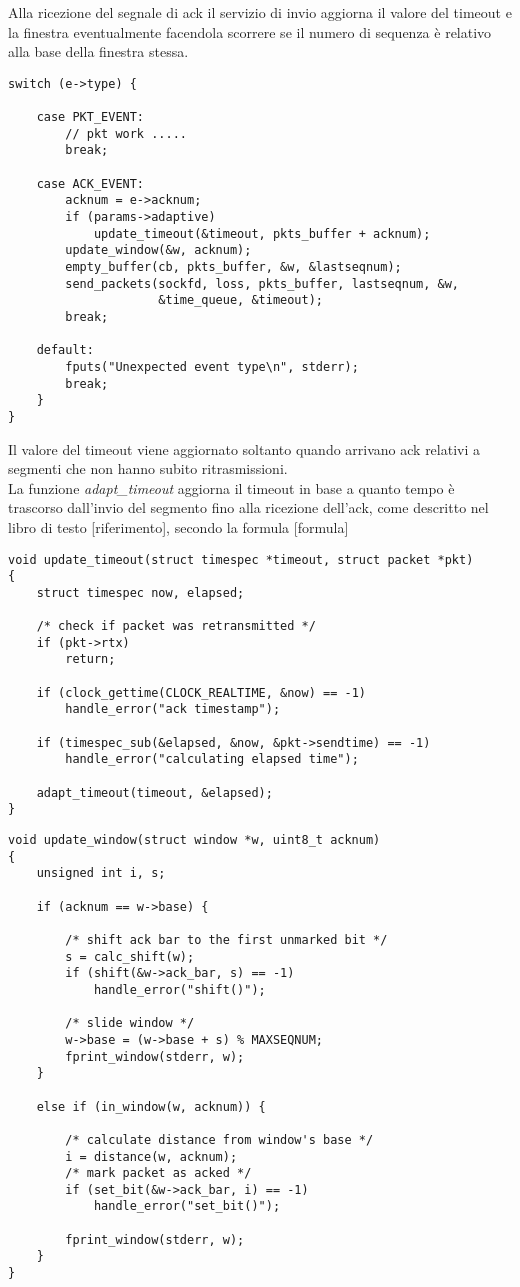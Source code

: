 Alla ricezione del segnale di ack il servizio di invio aggiorna il valore 
del timeout e la finestra eventualmente facendola scorrere se il numero
di sequenza è relativo alla base della finestra stessa.

\begin{lstlisting}[title=transport.c]
switch (e->type) {

    case PKT_EVENT:
        // pkt work .....
        break;

    case ACK_EVENT:
        acknum = e->acknum;
        if (params->adaptive)
            update_timeout(&timeout, pkts_buffer + acknum);
        update_window(&w, acknum);
        empty_buffer(cb, pkts_buffer, &w, &lastseqnum);
        send_packets(sockfd, loss, pkts_buffer, lastseqnum, &w,
                     &time_queue, &timeout);
        break;

    default:
        fputs("Unexpected event type\n", stderr);
        break;
    }
}
\end{lstlisting}
Il valore del timeout viene aggiornato soltanto quando arrivano ack relativi
a segmenti che non hanno subito ritrasmissioni.\\
La funzione \emph{adapt\_timeout} aggiorna il timeout in base a quanto tempo
è trascorso dall'invio del segmento fino alla ricezione dell'ack, come
descritto nel libro di testo [riferimento], secondo la formula [formula]
\begin{lstlisting}[title=transport.c]
void update_timeout(struct timespec *timeout, struct packet *pkt)
{
    struct timespec now, elapsed;

    /* check if packet was retransmitted */
    if (pkt->rtx)
        return;

    if (clock_gettime(CLOCK_REALTIME, &now) == -1)
        handle_error("ack timestamp");

    if (timespec_sub(&elapsed, &now, &pkt->sendtime) == -1)
        handle_error("calculating elapsed time");

    adapt_timeout(timeout, &elapsed);
}
\end{lstlisting}
\begin{lstlisting}[title=window.c]
void update_window(struct window *w, uint8_t acknum)
{
    unsigned int i, s;

    if (acknum == w->base) {

        /* shift ack bar to the first unmarked bit */
        s = calc_shift(w);
        if (shift(&w->ack_bar, s) == -1)
            handle_error("shift()");

        /* slide window */
        w->base = (w->base + s) % MAXSEQNUM;
        fprint_window(stderr, w);
    }

    else if (in_window(w, acknum)) {

        /* calculate distance from window's base */
        i = distance(w, acknum);
        /* mark packet as acked */
        if (set_bit(&w->ack_bar, i) == -1)
            handle_error("set_bit()");

        fprint_window(stderr, w);
    }
}
\end{lstlisting}
